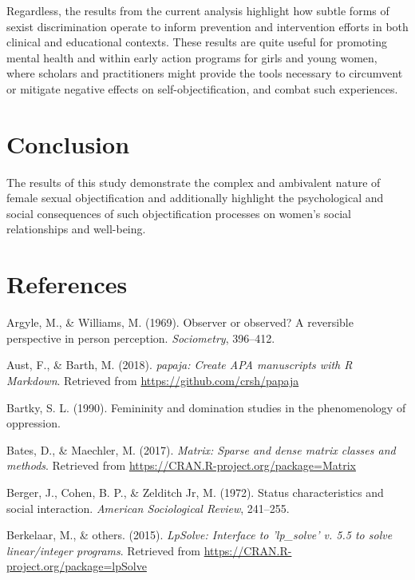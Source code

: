 \documentclass[man]{apa6}
\begin{document}
Regardless, the results from the current analysis highlight how subtle
forms of sexist discrimination operate to inform prevention and
intervention efforts in both clinical and educational contexts. These
results are quite useful for promoting mental health and within early
action programs for girls and young women, where scholars and
practitioners might provide the tools necessary to circumvent or
mitigate negative effects on self-objectification, and combat such
experiences.

\section{Conclusion}\label{conclusion}

The results of this study demonstrate the complex and ambivalent nature
of female sexual objectification and additionally highlight the
psychological and social consequences of such objectification processes
on women's social relationships and well-being.

\section{References}\label{references}

\newpage

\begingroup
\setlength{\parindent}{-0.5in} \setlength{\leftskip}{0.5in}

\hypertarget{refs}{}
\hypertarget{ref-argyle1969}{}
Argyle, M., \& Williams, M. (1969). Observer or observed? A reversible
perspective in person perception. \emph{Sociometry}, 396--412.

\hypertarget{ref-R-papaja}{}
Aust, F., \& Barth, M. (2018). \emph{papaja: Create APA manuscripts with
R Markdown}. Retrieved from \url{https://github.com/crsh/papaja}

\hypertarget{ref-Bartky}{}
Bartky, S. L. (1990). Femininity and domination studies in the
phenomenology of oppression.

\hypertarget{ref-R-Matrix}{}
Bates, D., \& Maechler, M. (2017). \emph{Matrix: Sparse and dense matrix
classes and methods}. Retrieved from
\url{https://CRAN.R-project.org/package=Matrix}

\hypertarget{ref-berger1972}{}
Berger, J., Cohen, B. P., \& Zelditch Jr, M. (1972). Status
characteristics and social interaction. \emph{American Sociological
Review}, 241--255.

\hypertarget{ref-R-lpSolve}{}
Berkelaar, M., \& others. (2015). \emph{LpSolve: Interface to
'lp\_solve' v. 5.5 to solve linear/integer programs}. Retrieved from
\url{https://CRAN.R-project.org/package=lpSolve}
\end{document}
